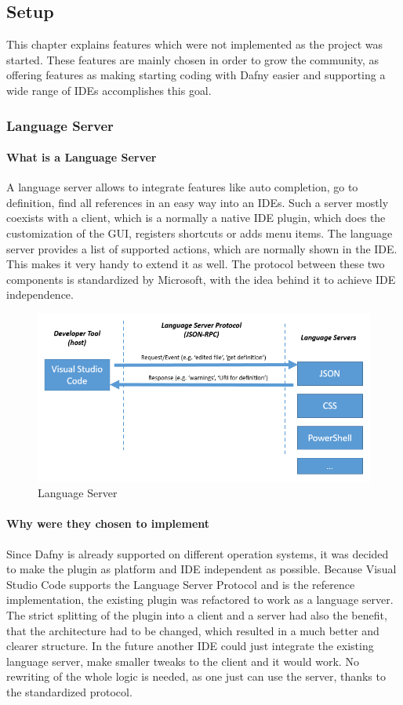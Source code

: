 \subsection{Setup}\label{setup}
This chapter explains features which were not implemented as the project was started. These features are mainly chosen in order to grow the community, as offering features as making starting coding with Dafny easier and supporting a wide range of IDEs accomplishes this goal.
\subsubsection{Language Server} \label{setupLanguageServer}
\paragraph{What is a Language Server}
A language server allows to integrate features like auto completion, go to definition, find all references in an easy way into an IDEs. Such a server mostly coexists with a client, which is a normally a native IDE plugin, which does the customization of the GUI, registers shortcuts or adds menu items. The language server provides a list of supported actions, which are normally shown in the IDE. This makes it very handy to extend it as well. 
The protocol between these two components is standardized by Microsoft, with the idea behind it to achieve IDE independence. 
 \newline
\begin{figure}[H]
	\centering
	\includegraphics[width=1.0\textwidth]{img/languageServer}
	\caption{Language Server}
	\label{fig:languageServer}
\end{figure}
\paragraph{Why were they chosen to implement}
Since Dafny is already supported on different operation systems, it was decided to make the plugin as platform and IDE independent as possible. Because Visual Studio Code supports the Language Server Protocol and is the reference implementation, the existing plugin was refactored to work as a language server. The strict splitting of the plugin into a client and a server had also the benefit, that the architecture had to be changed, which resulted in a much better and clearer structure. \newline
In the future another IDE could just integrate the existing language server, make smaller tweaks to the client and it would work. No rewriting of the whole logic is needed, as one just can use the server, thanks to the standardized protocol. 
